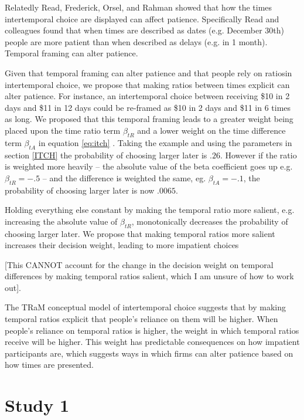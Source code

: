 \documentclass[]{article}
\begin{document}
Relatedly Read, Frederick, Orsel, and Rahman showed that how the times intertemporal choice are displayed can affect patience. Specifically Read and colleagues found that when times are described as dates (e.g. December 30th) people are more patient than when described as delays (e.g. in 1 month). Temporal framing can alter patience. 

Given that temporal framing can alter patience and that people rely on ratiosin intertemporal choice, we propose that making ratios between times explicit can alter patience. 
For instance, an intertemporal choice between receiving \$10 in 2 days and \$11 in 12 days could be re-framed as \$10 in 2 days and \$11 in 6 times as long. 
We proposed that this temporal framing leads to a greater weight being placed upon the time ratio term $\beta_{tR}$ and a lower weight on the time difference term $\beta_{tA}$ in equation \ref{eq:itch} . Taking the example and using the parameters in section \ref{ITCH} the probability of choosing larger later is $.26$. However if the ratio is weighted more heavily -- the absolute value of the beta coefficient goes up e.g.  $\beta_{tR} = -.5 $ -- and the difference is weighted the same, eg. $\beta_{tA} = -.1$, the probability of choosing larger later is now $.0065$. 

Holding everything else constant by making the temporal ratio more salient, e.g. increasing the absolute value of $\beta_{tR}$,  monotonically decreases the probability of choosing larger later. We propose that making temporal ratios more salient increases their decision weight, leading to more impatient choices

{\large [This CANNOT account for the change in the decision weight on temporal differences by making temporal ratios salient, which I am unsure of how to work out]. 
}

The TRaM conceptual model of intertemporal choice suggests that by making temporal ratios explicit that people's reliance on them will be higher.
When people's reliance on temporal ratios is higher, the weight in which temporal ratios receive will be higher. 
This weight has predictable consequences on how impatient participants are, which suggests ways in which firms can alter patience based on how times are presented. 




\section{Study 1}
\end{document}

